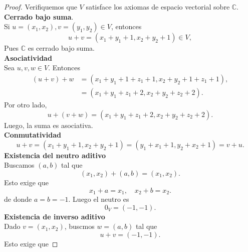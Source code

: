 \documentclass[12pt,a4paper]{article}
\begin{document}
    \begin{proof}
        Verifiquemos que $V$ satisface los axiomas de espacio vectorial sobre $\mathbb{C}$.\\
        \textbf{Cerrado bajo suma}.\\
        Si $u=(x_{1},x_{2}),v=(y_{1},y_{2})\in V$, entonces
        \begin{equation*}
            u+v=(x_{1}+y_{1}+1,x_{2}+y_{2}+1)\in V,
        \end{equation*}
        Pues $\mathbb{C}$ es cerrado bajo suma.\\
        \textbf{Asociatividad}\\
        Sea $u,v,w\in V$. Entonces
        \begin{align*}
            (u+v)+w&=(x_{1}+y_{1}+1+z_{1}+1,x_{2}+y_{2}+1+z_{1}+1),\\
            &=(x_{1}+y_{1}+z_{1}+2,x_{2}+y_{2}+z_{2}+2).
        \end{align*}
        Por otro lado,
        \begin{equation*}
            u+(v+w)=(x_{1}+y_{1}+z_{1}+2,x_{2}+y_{2}+z_{2}+2).
        \end{equation*}
        Luego, la suma es asociativa.\\
        \textbf{Conmutatividad}\\
        \begin{equation*}
            u+v=(x_{1}+y_{1}+1,x_{2}+y_{2}+1)=(y_{1}+x_{1}+1,y_{2}+x_{2}+1)=v+u.
        \end{equation*}
        \textbf{Existencia del neutro aditivo}\\
        Buscamos $(a,b)$ tal que
        \begin{equation*}
            (x_{1},x_{2})+(a,b)=(x_{1},x_{2}).
        \end{equation*}
        Esto exige que
        \begin{equation*}
            x_{1}+a=x_{1}, \quad x_{2}+b=x_{2}.
        \end{equation*}
        de donde $a=b=-1$. Luego el neutro es
        \begin{equation*}
            0_{V}=(-1,-1).
        \end{equation*}
        \textbf{Existencia de inverso aditivo}\\
        Dado $v=(x_{1},x_{2})$, buscmos $w=(a,b)$ tal que
        \begin{equation*}
            u+v=(-1,-1).
        \end{equation*}
        Esto exige que

\end{proof}
\end{document}
